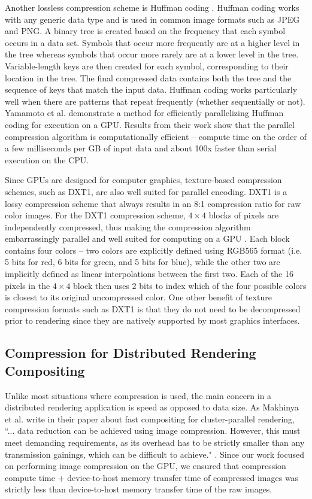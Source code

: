 \documentclass{vgtc}                          %
\begin{document}
Another lossless compression scheme is Huffman coding \cite{Huffman_1952}. Huffman coding works with any generic data type and is used in common image formats such as JPEG and PNG. A binary tree is created based on the frequency that each symbol occurs in a data set. Symbols that occur more frequently are at a higher level in the tree whereas symbols that occur more rarely are at a lower level in the tree. Variable-length keys are then created for each symbol, corresponding to their location in the tree. The final compressed data contains both the tree and the sequence of keys that match the input data. Huffman coding works particularly well when there are patterns that repeat frequently (whether sequentially or not). Yamamoto et al. \cite{Yamamoto_2020} demonstrate a method for efficiently parallelizing Huffman coding for execution on a GPU. Results from their work show that the parallel compression algorithm is computationally efficient -- compute time on the order of a few milliseconds per GB of input data and about 100x faster than serial execution on the CPU.


Since GPUs are designed for computer graphics, texture-based compression schemes, such as DXT1, are also well suited for parallel encoding. DXT1 is a lossy compression scheme that always results in an 8:1 compression ratio for raw color images. For the DXT1 compression scheme, $4 \times 4$ blocks of pixels are independently compressed, thus making the compression algorithm embarrassingly parallel and well suited for computing on a GPU \cite{Castano_2007,Emerson_2019}. Each block contains four colors -- two colors are explicitly defined using RGB565 format (i.e. 5 bits for red, 6 bits for green, and 5 bits for blue), while the other two are implicitly defined as linear interpolations between the first two. Each of the 16 pixels in the $4 \times 4$ block then uses 2 bits to index which of the four possible colors is closest to its original uncompressed color. One other benefit of texture compression formats such as DXT1 is that they do not need to be decompressed prior to rendering since they are natively supported by most graphics interfaces.

\subsection{Compression for Distributed Rendering\texorpdfstring{\\}{ }Compositing}
Unlike most situations where compression is used, the main concern in a distributed rendering application is speed as opposed to data size. As Makhinya et al. write in their paper about fast compositing for cluster-parallel rendering, ``... data reduction can be achieved using image compression. However, this must meet demanding requirements, as its overhead has to be strictly smaller than any transmission gainings, which can be difficult to achieve." \cite{Makhinya_2010}. Since our work focused on performing image compression on the GPU, we ensured that compression compute time + device-to-host memory transfer time of compressed images was strictly less than device-to-host memory transfer time of the raw images.
\end{document}
